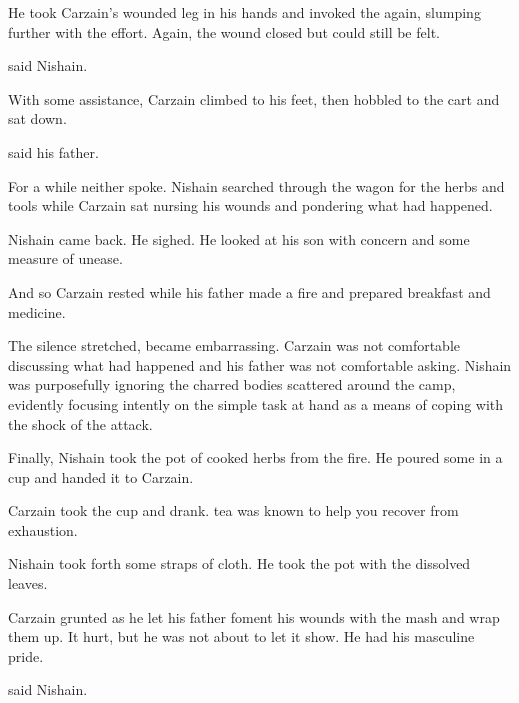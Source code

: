 He took Carzain's wounded leg in his hands and invoked the \Sephirah{} again, slumping further with the effort. 
Again, the wound closed but could still be felt. 

 said Nishain. 

With some assistance, Carzain climbed to his feet, then hobbled to the cart and sat down. 

 said his father. 

For a while neither spoke. 
Nishain searched through the wagon for the herbs and tools while Carzain sat nursing his wounds and pondering what had happened. 

Nishain came back. 
He sighed. 
He looked at his son with concern and some measure of unease. 

And so Carzain rested while his father made a fire and prepared breakfast and medicine. 

The silence stretched, became embarrassing. 
Carzain was not comfortable discussing what had happened and his father was not comfortable asking. 
Nishain was purposefully ignoring the charred bodies scattered around the camp, evidently focusing intently on the simple task at hand as a means of coping with the shock of the attack. 

Finally, Nishain took the pot of cooked herbs from the fire. 
He poured some in a cup and handed it to Carzain. 

Carzain took the cup and drank. 
\Jiliba{} tea was known to help you recover from exhaustion. 

Nishain took forth some straps of cloth. 
He took the pot with the dissolved \dvingen{} leaves. 

Carzain grunted as he let his father foment his wounds with the \dvingen{} mash and wrap them up. 
It hurt, but he was not about to let it show. 
He had his masculine pride. 

 said Nishain. 


